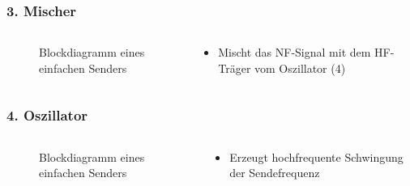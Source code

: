 \begin{frame}
\frametitle{3. Mischer}
\begin{columns}
    \begin{column}{0.48\textwidth}
    
\begin{figure}
    \caption{\scriptsize Blockdiagramm eines einfachen Senders}
    \label{aufbau_sender}
\end{figure}


    \end{column}
   \begin{column}{0.48\textwidth}
       \begin{itemize}
  \item Mischt das NF-Signal mit dem HF-Träger vom Oszillator (4)
  \end{itemize}

   \end{column}
\end{columns}

\end{frame}

\begin{frame}
\frametitle{4. Oszillator}
\begin{columns}
    \begin{column}{0.48\textwidth}
    
\begin{figure}
    \caption{\scriptsize Blockdiagramm eines einfachen Senders}
    \label{aufbau_sender}
\end{figure}


    \end{column}
   \begin{column}{0.48\textwidth}
       \begin{itemize}
  \item Erzeugt hochfrequente Schwingung der Sendefrequenz
  \end{itemize}

   \end{column}
\end{columns}

\end{frame}

